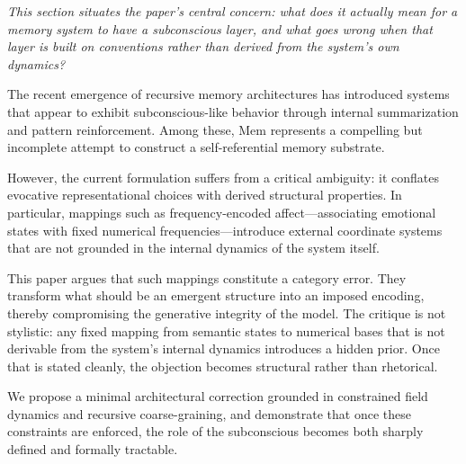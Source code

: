 \documentclass[12pt,a4paper]{article}
\begin{document}
\textit{This section situates the paper's central concern: what does it actually mean for a memory system to have a subconscious layer, and what goes wrong when that layer is built on conventions rather than derived from the system's own dynamics?}

The recent emergence of recursive memory architectures has introduced systems that appear to exhibit subconscious-like behavior through internal summarization and pattern reinforcement. Among these, Mem represents a compelling but incomplete attempt to construct a self-referential memory substrate.

However, the current formulation suffers from a critical ambiguity: it conflates evocative representational choices with derived structural properties. In particular, mappings such as frequency-encoded affect---associating emotional states with fixed numerical frequencies---introduce external coordinate systems that are not grounded in the internal dynamics of the system itself.

This paper argues that such mappings constitute a category error. They transform what should be an emergent structure into an imposed encoding, thereby compromising the generative integrity of the model. The critique is not stylistic: any fixed mapping from semantic states to numerical bases that is not derivable from the system's internal dynamics introduces a hidden prior. Once that is stated cleanly, the objection becomes structural rather than rhetorical.

We propose a minimal architectural correction grounded in constrained field dynamics and recursive coarse-graining, and demonstrate that once these constraints are enforced, the role of the subconscious becomes both sharply defined and formally tractable.
\end{document}

